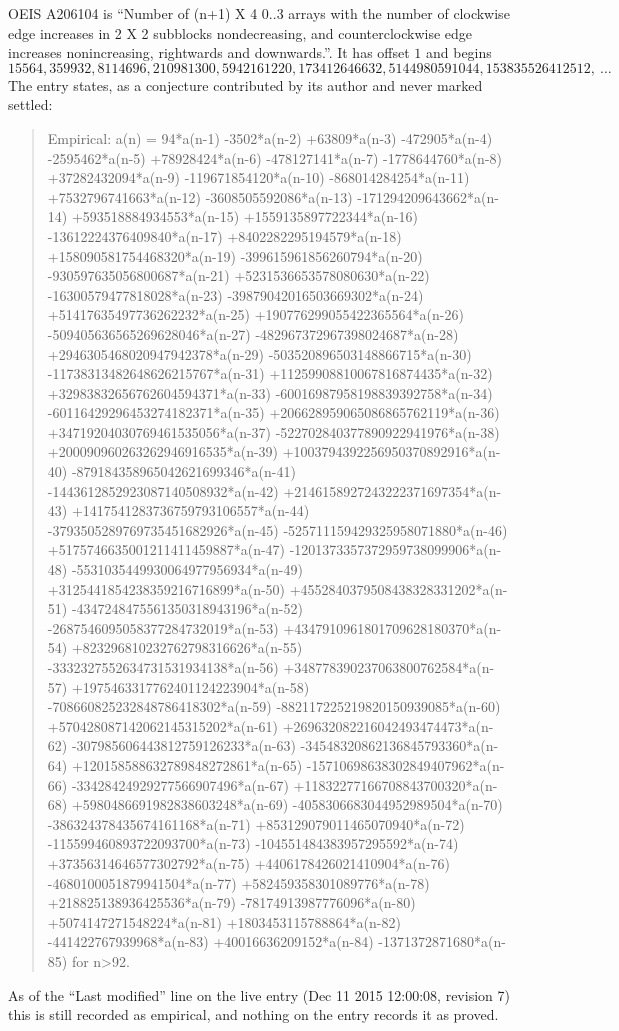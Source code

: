 \documentclass[11pt,a4paper]{article}
\theoremstyle{plain}
\theoremstyle{definition}
\begin{document}
OEIS A206104 is ``Number of (n+1) X 4 0..3 arrays with the number of clockwise edge increases in 2 X 2 subblocks nondecreasing, and counterclockwise edge increases nonincreasing, rightwards and downwards.''. It has offset $1$ and begins
\[
15564, 359932, 8114696, 210981300, 5942161220, 173412646632, 5144980591044, 153835526412512,\ \dots
\]
The entry states, as a conjecture contributed by its author and never marked settled:
\begin{quote}
Empirical: a(n) = 94*a(n-1) -3502*a(n-2) +63809*a(n-3) -472905*a(n-4) -2595462*a(n-5) +78928424*a(n-6) -478127141*a(n-7) -1778644760*a(n-8) +37282432094*a(n-9) -119671854120*a(n-10) -868014284254*a(n-11) +7532796741663*a(n-12) -3608505592086*a(n-13) -171294209643662*a(n-14) +593518884934553*a(n-15) +1559135897722344*a(n-16) -13612224376409840*a(n-17) +8402282295194579*a(n-18) +158090581754468320*a(n-19) -399615961856260794*a(n-20) -930597635056800687*a(n-21) +5231536653578080630*a(n-22) -16300579477818028*a(n-23) -39879042016503669302*a(n-24) +51417635497736262232*a(n-25) +190776299055422365564*a(n-26) -509405636565269628046*a(n-27) -482967372967398024687*a(n-28) +2946305468020947942378*a(n-29) -503520896503148866715*a(n-30) -11738313482648626215767*a(n-31) +11259908810067816874435*a(n-32) +32983832656762604594371*a(n-33) -60016987958198839392758*a(n-34) -60116429296453274182371*a(n-35) +206628959065086865762119*a(n-36) +34719204030769461535056*a(n-37) -522702840377890922941976*a(n-38) +200090960263262946916535*a(n-39) +1003794392256950370892916*a(n-40) -879184358965042621699346*a(n-41) -1443612852923087140508932*a(n-42) +2146158927243222371697354*a(n-43) +1417541283736759793106557*a(n-44) -3793505289769735451682926*a(n-45) -525711159429325958071880*a(n-46) +5175746635001211411459887*a(n-47) -1201373357372959738099906*a(n-48) -5531035449930064977956934*a(n-49) +3125441854238359216716899*a(n-50) +4552840379508438328331202*a(n-51) -4347248475561350318943196*a(n-52) -2687546095058377284732019*a(n-53) +4347910961801709628180370*a(n-54) +823296810232762798316626*a(n-55) -3332327552634731531934138*a(n-56) +348778390237063800762584*a(n-57) +1975463317762401124223904*a(n-58) -708660825232848786418302*a(n-59) -882117225219820150939085*a(n-60) +570428087142062145315202*a(n-61) +269632082216042493474473*a(n-62) -307985606443812759126233*a(n-63) -34548320862136845793360*a(n-64) +120158588632789848272861*a(n-65) -15710698638302849407962*a(n-66) -33428424929277566907496*a(n-67) +11832277166708843700320*a(n-68) +5980486691982838603248*a(n-69) -4058306683044952989504*a(n-70) -386324378435674161168*a(n-71) +853129079011465070940*a(n-72) -115599460893722093700*a(n-73) -104551484383957295592*a(n-74) +37356314646577302792*a(n-75) +4406178426021410904*a(n-76) -4680100051879941504*a(n-77) +582459358301089776*a(n-78) +218825138936425536*a(n-79) -78174913987776096*a(n-80) +5074147271548224*a(n-81) +1803453115788864*a(n-82) -441422767939968*a(n-83) +40016636209152*a(n-84) -1371372871680*a(n-85) for n>92.
\end{quote}
As of the ``Last modified'' line on the live entry (Dec 11 2015 12:00:08, revision 7) this is still
recorded as empirical, and nothing on the entry records it as proved.
\end{document}

